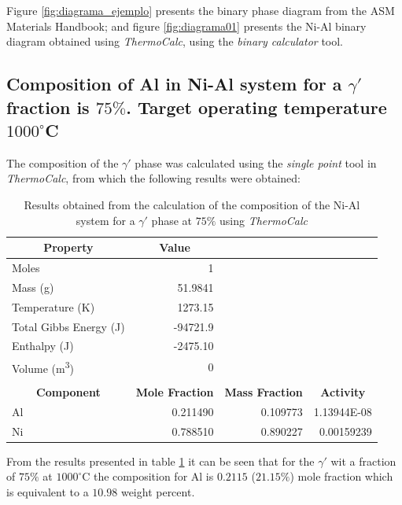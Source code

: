 Figure \ref{fig:diagrama_ejemplo} presents the binary phase diagram from the ASM Materials Handbook; and figure \ref{fig:diagrama01} presents the Ni-Al binary diagram obtained using \textit{ThermoCalc}, using the \textit{binary calculator} tool.

\newpage
\subsection{Composition of Al in Ni-Al system for a $\gamma'$ fraction is $75\%$. Target operating temperature $1000^{\circ}$C}

The composition of the $\gamma'$ phase was calculated using the \textit{single point} tool in \textit{ThermoCalc}, from which the following results were obtained:

\begin{table}[H]
    \centering
    \begin{tabular}{lrrr}
        \multicolumn{1}{c}{\textbf{Property}} & \multicolumn{1}{c}{\textbf{Value}} \\ \hline \hline
        Moles & 1 \\ 
        Mass (g) & 51.9841 \\ 
        Temperature (K) & 1273.15 \\ 
        Total Gibbs Energy (J) & -94721.9 \\
        Enthalpy (J) & -2475.10 \\
        Volume (m\textsuperscript{3}) & 0 \\ \\
        \multicolumn{1}{c}{\textbf{Component}} & \multicolumn{1}{c}{\textbf{Mole Fraction}} & \multicolumn{1}{c}{\textbf{Mass Fraction}} & \multicolumn{1}{c}{\textbf{Activity}}\\ \hline \hline
        Al & 0.211490 & 0.109773 & 1.13944E-08 \\
        Ni & 0.788510 & 0.890227 & 0.00159239
    \end{tabular}
    \caption{Results obtained from the calculation of the composition of the Ni-Al system for a $\gamma'$ phase at $75\%$ using \textit{ThermoCalc} \citep{thermocalc}}
    \label{tab:tab01}
\end{table}

From the results presented in table \ref{tab:tab01} it can be seen that for the $\gamma'$ wit a fraction of $75\%$ at $1000^{\circ}$C the composition for Al is $0.2115$ ($21.15\%$) mole fraction which is equivalent to a $10.98$ weight percent.